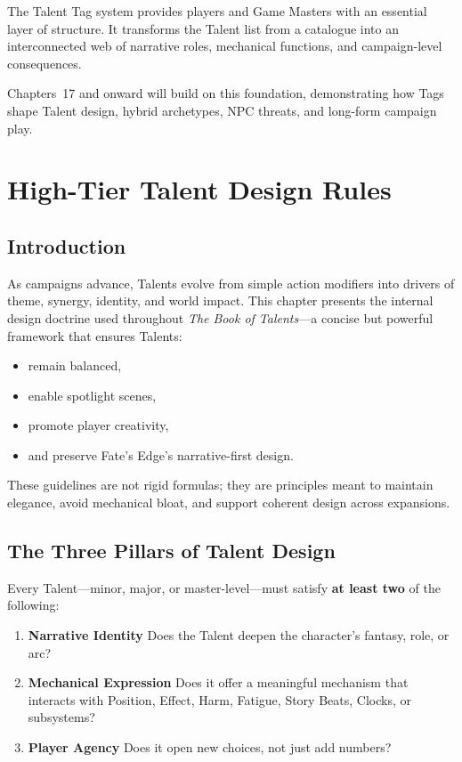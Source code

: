 \documentclass[11pt]{book}
\begin{document}
The Talent Tag system provides players and Game Masters with an essential layer of structure.
It transforms the Talent list from a catalogue into an interconnected web of
narrative roles, mechanical functions, and campaign-level consequences.

Chapters~17 and onward will build on this foundation,
demonstrating how Tags shape Talent design, hybrid archetypes,
NPC threats, and long-form campaign play.


\chapter{High-Tier Talent Design Rules}

\section{Introduction}

As campaigns advance, Talents evolve from simple action modifiers
into drivers of theme, synergy, identity, and world impact.
This chapter presents the internal design doctrine used throughout
\emph{The Book of Talents}---a concise but powerful framework
that ensures Talents:
\begin{itemize}
    \item remain balanced,
    \item enable spotlight scenes,
    \item promote player creativity,
    \item and preserve Fate's Edge's narrative-first design.
\end{itemize}

These guidelines are not rigid formulas;
they are principles meant to maintain elegance,
avoid mechanical bloat, and support coherent design across expansions.

\section{The Three Pillars of Talent Design}

Every Talent---minor, major, or master-level---must satisfy
\textbf{at least two} of the following:

\begin{enumerate}
    \item \textbf{Narrative Identity}  
    Does the Talent deepen the character's fantasy, role, or arc?

    \item \textbf{Mechanical Expression}  
    Does it offer a meaningful mechanism that interacts with
    Position, Effect, Harm, Fatigue, Story Beats, Clocks, or subsystems?

    \item \textbf{Player Agency}  
    Does it open new choices, not just add numbers?
\end{enumerate}
\end{document}
